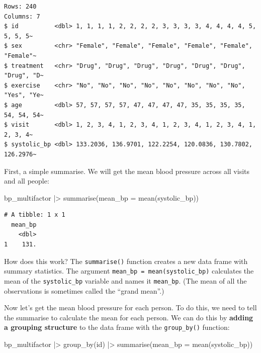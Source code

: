 \documentclass[
  letterpaper,
  8pt,
  a4paper]{book}
\newenvironment{Shaded}{\begin{snugshade}}{\end{snugshade}}
\newcommand{\AttributeTok}[1]{\textcolor[rgb]{0.40,0.45,0.13}{#1}}
\newcommand{\FunctionTok}[1]{\textcolor[rgb]{0.28,0.35,0.67}{#1}}
\newcommand{\NormalTok}[1]{\textcolor[rgb]{0.00,0.23,0.31}{#1}}
\newcommand{\SpecialCharTok}[1]{\textcolor[rgb]{0.37,0.37,0.37}{#1}}
\begin{document}
\begin{verbatim}
Rows: 240
Columns: 7
$ id          <dbl> 1, 1, 1, 1, 2, 2, 2, 2, 3, 3, 3, 3, 4, 4, 4, 4, 5, 5, 5, 5~
$ sex         <chr> "Female", "Female", "Female", "Female", "Female", "Female"~
$ treatment   <chr> "Drug", "Drug", "Drug", "Drug", "Drug", "Drug", "Drug", "D~
$ exercise    <chr> "No", "No", "No", "No", "No", "No", "No", "No", "Yes", "Ye~
$ age         <dbl> 57, 57, 57, 57, 47, 47, 47, 47, 35, 35, 35, 35, 54, 54, 54~
$ visit       <dbl> 1, 2, 3, 4, 1, 2, 3, 4, 1, 2, 3, 4, 1, 2, 3, 4, 1, 2, 3, 4~
$ systolic_bp <dbl> 133.2036, 136.9701, 122.2254, 120.0836, 130.7802, 126.2976~
\end{verbatim}

First, a simple summarise. We will get the mean blood pressure across
all visits and all people:

\begin{Shaded}
\begin{Highlighting}[]
\NormalTok{bp\_multifactor }\SpecialCharTok{|\textgreater{}}
  \FunctionTok{summarise}\NormalTok{(}\AttributeTok{mean\_bp =} \FunctionTok{mean}\NormalTok{(systolic\_bp))}
\end{Highlighting}
\end{Shaded}

\begin{verbatim}
# A tibble: 1 x 1
  mean_bp
    <dbl>
1    131.
\end{verbatim}

How does this work? The \texttt{summarise()} function creates a new data
frame with summary statistics. The argument
\texttt{mean\_bp\ =\ mean(systolic\_bp)} calculates the mean of the
\texttt{systolic\_bp} variable and names it \texttt{mean\_bp}. (The mean
of all the observations is sometimes called the ``grand mean''.)

Now let's get the mean blood pressure for each person. To do this, we
need to tell the summarise to calculate the mean for each person. We can
do this by \textbf{adding a grouping structure} to the data frame with
the \texttt{group\_by()} function:

\begin{Shaded}
\begin{Highlighting}[]
\NormalTok{bp\_multifactor }\SpecialCharTok{|\textgreater{}}
  \FunctionTok{group\_by}\NormalTok{(id) }\SpecialCharTok{|\textgreater{}}
  \FunctionTok{summarise}\NormalTok{(}\AttributeTok{mean\_bp =} \FunctionTok{mean}\NormalTok{(systolic\_bp))}
\end{Highlighting}
\end{Shaded}
\end{document}
